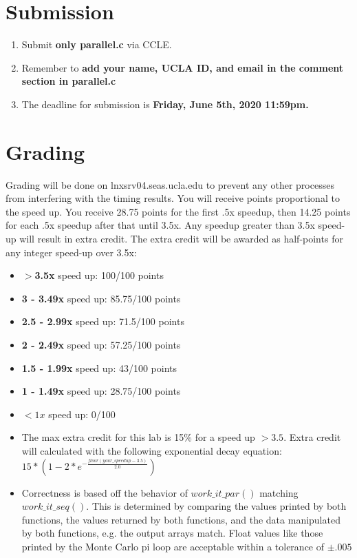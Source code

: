 \documentclass[11pt]{article}
\begin{document}
\section{Submission}
\begin{enumerate}
    \item Submit \textbf{only parallel.c} via CCLE.
    \item Remember to \textbf{add your name, UCLA ID, and email in the comment section in parallel.c}
    \item The deadline for submission is \textbf{Friday, June 5th, 2020 11:59pm.}
\end{enumerate}


\section{Grading}
Grading will be done on lnxsrv04.seas.ucla.edu to prevent any other processes from interfering with the timing results. You will receive points proportional to the speed up. You receive 28.75 points for the first .5x speedup, then 14.25 points for each .5x speedup after that until 3.5x. Any speedup greater than 3.5x speed-up will result in extra credit. The extra credit will be awarded as half-points for any integer speed-up over 3.5x:
\begin{itemize}
    \item \textbf{$>$3.5x} speed up: 100/100 points
    \item \textbf{3 - 3.49x} speed up: 85.75/100 points
    \item \textbf{2.5 - 2.99x} speed up: 71.5/100 points
    \item \textbf{2 - 2.49x} speed up: 57.25/100 points
    \item \textbf{1.5 - 1.99x} speed up: 43/100 points
    \item \textbf{1 - 1.49x} speed up: 28.75/100 points
    \item $<1x$ speed up: 0/100
    \item The max extra credit for this lab is 15\% for a speed up $>3.5$. Extra credit will calculated with the following exponential decay equation: $ 15*(1-2*e^{-\frac{floor(your\_speedup - 3.5)}{2.0}})$\\
    
    \item Correctness is based off the behavior of $work\_it\_par()$ matching $work\_it\_seq()$. This is determined by comparing the values printed by both functions, the values returned by both functions, and the data manipulated by both functions, e.g. the output arrays match. Float values like those printed by the Monte Carlo pi loop are acceptable within a tolerance of $\pm.005$
    
\end{itemize}
\end{document}
